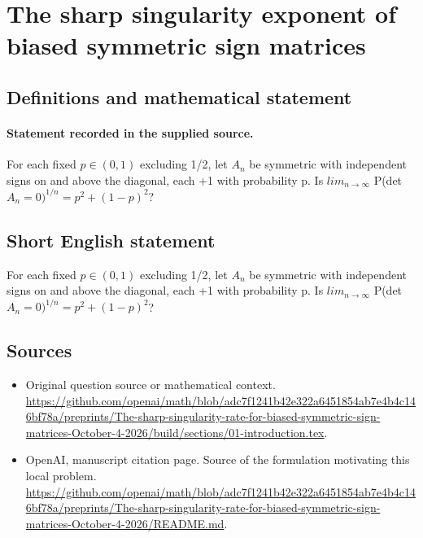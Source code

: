 \documentclass[11pt]{article}
\begin{document}
\section*{The sharp singularity exponent of biased symmetric sign matrices}\label{30007346}
\subsection{Definitions and mathematical statement}
\paragraph{Statement recorded in the supplied source.}
For each fixed $p\in (0,1)$ excluding 1/2, let $A_n$ be symmetric with independent signs on and above the diagonal, each +1 with probability p. Is $lim_{n\to \infty }$ P(det $A_n=0)^{1/n}=p^2+(1-p)^2$?
\subsection{Short English statement}
For each fixed $p\in (0,1)$ excluding 1/2, let $A_n$ be symmetric with independent signs on and above the diagonal, each +1 with probability p. Is $lim_{n\to \infty }$ P(det $A_n=0)^{1/n}=p^2+(1-p)^2$?
\subsection{Sources}
\begin{itemize}
\item[S1] Original question source or mathematical context.
\url{https://github.com/openai/math/blob/adc7f1241b42e322a6451854ab7e4b4c146bf78a/preprints/The-sharp-singularity-rate-for-biased-symmetric-sign-matrices-October-4-2026/build/sections/01-introduction.tex}.
\item[S2] OpenAI, manuscript citation page. Source of the formulation motivating this local problem.
\url{https://github.com/openai/math/blob/adc7f1241b42e322a6451854ab7e4b4c146bf78a/preprints/The-sharp-singularity-rate-for-biased-symmetric-sign-matrices-October-4-2026/README.md}.
\end{itemize}
\end{document}
